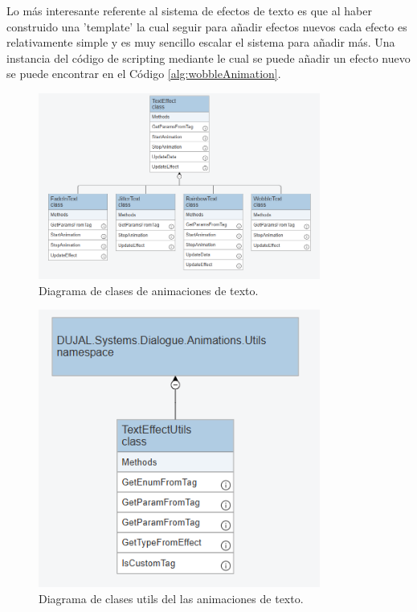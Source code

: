 Lo más interesante referente al sistema de efectos de texto es que al haber construido una 'template' la cual seguir para añadir efectos nuevos cada efecto es relativamente 
simple y es muy sencillo escalar el sistema para añadir más. Una instancia del código de scripting mediante le cual se puede añadir un efecto nuevo se puede encontrar en
el Código \ref{alg:wobbleAnimation}.

\begin{figure}[H]
  \centering
    \includegraphics[width=350px,clip=true]{Text_Effects.png}
  \caption{Diagrama de clases de animaciones de texto.}
  \label{fig:dialogueUml3}
\end{figure}


\begin{figure}[H]
  \centering
    \includegraphics[width=350px,clip=true]{Text_Effect_Utils.png}
  \caption{Diagrama de clases utils del las animaciones de texto.}
  \label{fig:dialogueUml4}
\end{figure}

